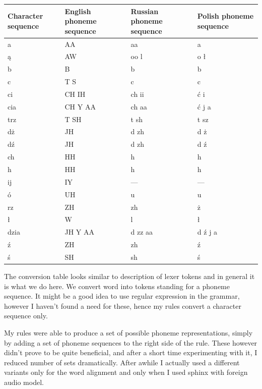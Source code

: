 \documentclass[12pt,a4paper,english]{article}
\begin{document}
\begin{center}
\begin{tabular}{| p{3.5cm} | p{3.5cm} | p{3.5cm} | p{3.3cm} |}
\hline
\rowcolor[gray]{0.8}
Character sequence & English phoneme sequence & Russian phoneme sequence & Polish phoneme sequence
\\ \hline
a & AA & aa & a
\\ \hline
ą & AW & oo l & o ł
\\ \hline
b & B & b & b
\\ \hline
c & T S & c & c
\\ \hline
ci & CH IH & ch ii & ć i
\\ \hline
cia & CH Y AA & ch aa & ć j a 
\\ \hline
trz & T SH & t sh & t sz
\\ \hline
dż & JH & d zh & d ż
\\ \hline
dź & JH & d zh & d ź
\\ \hline
ch & HH & h & h
\\ \hline
h & HH & h & h
\\ \hline
ij & IY & --- & ---
\\ \hline
ó & UH & u & u
\\ \hline
rz & ZH & zh & ż
\\ \hline
ł & W & l & ł
\\ \hline
dzia & JH Y AA & d zz aa & d ź j a
\\ \hline
ź & ZH & zh & ź
\\ \hline
ś & SH & sh & ś
\\ \hline
\end{tabular}
\end{center}

\newpage

The conversion table looks similar to description of lexer tokens and in general it is what we do here. We convert word into tokens standing for a phoneme sequence. It might be a good idea to use regular expression in the grammar, however I haven't found a need for these, hence my rules convert a character sequence only. \newline

My rules were able to produce a set of possible phoneme representations, simply by adding a set of phoneme sequences to the right side of the rule. These however didn't prove to be quite beneficial, and after a short time experimenting with it, I reduced number of sets dramatically. After awhile I actually used a different variants only for the word alignment and only when I used sphinx with foreign audio model. \newline
\end{document}
